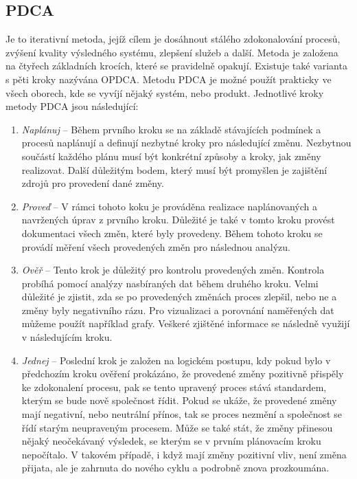 \documentclass[czech,master]{diploma}
\begin{document}
\subsection{PDCA}
Je to iterativní metoda, jejíž cílem je dosáhnout stálého zdokonalování procesů, zvýšení kvality výsledného systému, zlepšení služeb a další. Metoda je založena na čtyřech základních krocích, které se pravidelně opakují. Existuje také varianta s pěti kroky nazývána OPDCA. Metodu PDCA je možné použít prakticky ve všech oborech, kde se vyvíjí nějaký systém, nebo produkt.  Jednotlivé kroky metody PDCA jsou následující:

\begin{enumerate}
\item \textit{Naplánuj} -- Během prvního kroku se na základě stávajících podmínek a procesů naplánují a definují nezbytné kroky pro následující změnu. Nezbytnou součástí každého plánu musí být konkrétní způsoby a kroky, jak změny realizovat. Další důležitým bodem, který musí být promyšlen je zajištění zdrojů pro provedení dané změny.
\item \textit{Proveď} -- V rámci tohoto koku je prováděna realizace naplánovaných a navržených úprav z prvního kroku. Důležité je také v tomto kroku provést dokumentaci všech změn, které byly provedeny. Během tohoto kroku se provádí měření všech provedených změn pro následnou analýzu.
\item \textit{Ověř} -- Tento krok je důležitý pro kontrolu provedených změn. Kontrola probíhá pomocí analýzy nasbíraných dat během druhého kroku. Velmi důležité je zjistit, zda se po provedených změnách proces zlepšil, nebo ne a změny byly negativního rázu. Pro vizualizaci a porovnání naměřených dat můžeme použít například grafy. Veškeré zjištěné informace se následně využijí v následujícím kroku.
\item \textit{Jednej} -- Poslední krok je založen na logickém postupu, kdy pokud bylo v předchozím kroku ověření prokázáno, že provedené změny pozitivně přispěly ke zdokonalení procesu, pak se tento upravený proces stává standardem, kterým se bude nově společnost řídit. Pokud se ukáže, že provedené změny mají negativní, nebo neutrální přínos, tak se proces nezmění a společnost se řídí starým neupraveným procesem. Může se také stát, že změny přinesou nějaký neočekávaný výsledek, se kterým se v prvním plánovacím kroku nepočítalo. V takovém případě, i když mají změny pozitivní vliv, není změna přijata, ale je zahrnuta do nového cyklu a podrobně znova prozkoumána.
\end{enumerate}
\end{document}
